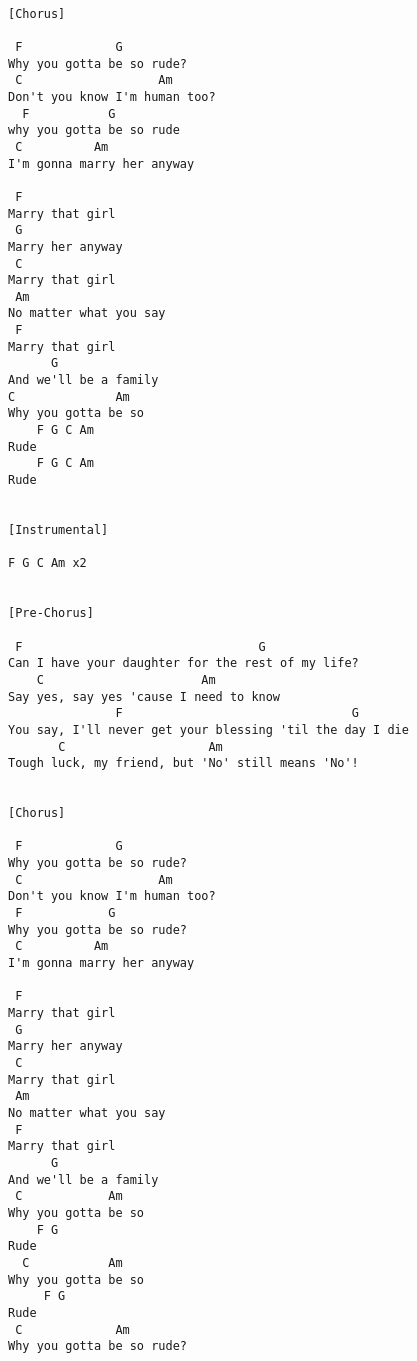 \documentclass[../../songbookMain]{subfiles}
\begin{document}
\begin{verbatim}
 
[Chorus]
 
 F             G
Why you gotta be so rude?
 C                   Am
Don't you know I'm human too?
  F           G
why you gotta be so rude
 C          Am
I'm gonna marry her anyway
 
 F
Marry that girl
 G
Marry her anyway
 C
Marry that girl
 Am
No matter what you say
 F
Marry that girl
      G
And we'll be a family
C              Am
Why you gotta be so
    F G C Am
Rude
    F G C Am
Rude
 
 
[Instrumental]
 
F G C Am x2
 
 
[Pre-Chorus]
 
 F                                 G
Can I have your daughter for the rest of my life?
    C                      Am
Say yes, say yes 'cause I need to know
               F                                G
You say, I'll never get your blessing 'til the day I die
       C                    Am
Tough luck, my friend, but 'No' still means 'No'!
 
 
[Chorus]
 
 F             G
Why you gotta be so rude?
 C                   Am
Don't you know I'm human too?
 F            G
Why you gotta be so rude?
 C          Am
I'm gonna marry her anyway
 
 F
Marry that girl
 G
Marry her anyway
 C
Marry that girl
 Am
No matter what you say
 F
Marry that girl
      G
And we'll be a family
 C            Am
Why you gotta be so
    F G
Rude
  C           Am
Why you gotta be so
     F G
Rude
 C             Am
Why you gotta be so rude?

\end{verbatim}
\end{document}
